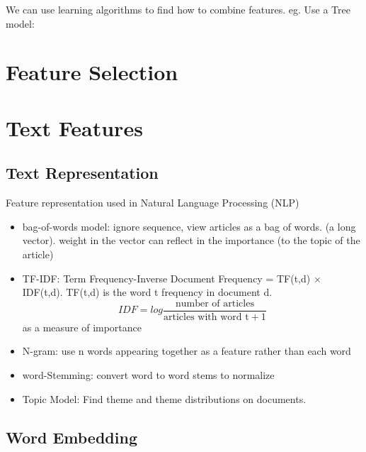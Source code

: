 \documentclass[11pt, openany]{book}              %
\begin{document}
We can use learning algorithms to find how to combine features. eg. Use a Tree model:


\section{Feature Selection}

\section{Text Features}

\subsection{Text Representation}

Feature representation used in Natural Language Processing (NLP)
\begin{itemize}
	\item bag-of-words model: ignore sequence, view articles as a bag of words. (a long vector). weight in the vector can reflect in the importance (to the topic of the article)
	\item TF-IDF: Term Frequency-Inverse Document Frequency = TF(t,d) $\times$ IDF(t,d). TF(t,d) is the word t frequency in document d. 
		$$IDF = log \frac{\text{number of articles}}{\text{articles with word t} + 1}$$
		as a measure of importance
	\item N-gram: use n words appearing together as a feature rather than each word
	\item word-Stemming: convert word to word stems to normalize
	\item Topic Model: Find theme and theme distributions on documents.
\end{itemize}
\subsection{Word Embedding}
\end{document}
